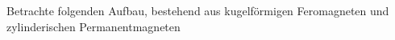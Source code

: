 \begin{Exercise}[title = Magnetische Pyramide, origin = Estnisch-Finnische Physikolympiade 2004, difficulty = 4, label = magnetictetrahedron]
	Betrachte folgenden Aufbau, bestehend aus kugelförmigen Feromagneten und zylinderischen Permanentmagneten
\end{Exercise}
